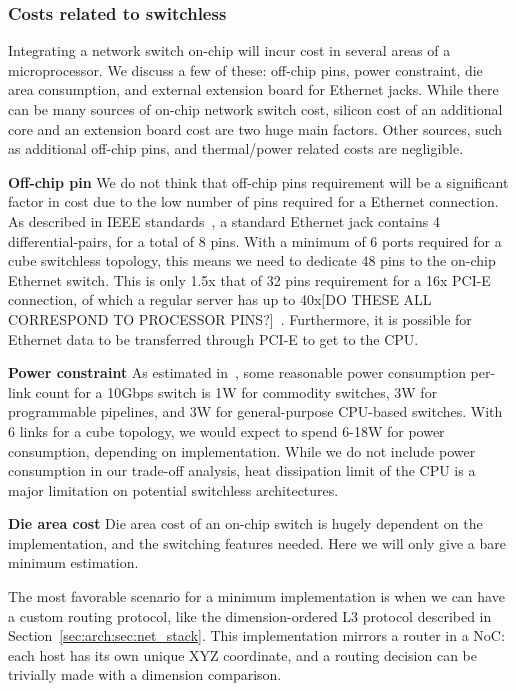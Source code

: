 \subsubsection{Costs related to switchless}
Integrating a network switch on-chip will incur cost in several areas of a microprocessor. We discuss a few of these: off-chip pins, power constraint, die area consumption, and external extension board for Ethernet jacks. While there can be many sources of on-chip network switch cost, silicon cost of an additional core and an extension board cost are two huge main factors. Other sources, such as additional off-chip pins, and thermal/power related costs are negligible. 
\newcommand{\subsubsubsection}{\textbf}

\subsubsubsection{Off-chip pin}
We do not think that off-chip pins requirement will be a significant factor in cost due to the low number of pins required for a Ethernet connection. As described in IEEE standards~\cite{eithercitation?}, a standard Ethernet jack contains 4 differential-pairs, for a total of 8 pins. With a minimum of 6 ports required for a cube switchless topology, this means we need to dedicate 48 pins to the on-chip Ethernet switch. This is only 1.5x that of 32 pins requirement for a 16x PCI-E connection, of which a regular server has up to 40x[DO THESE ALL CORRESPOND TO PROCESSOR PINS?]~\cite{https://www-ssl.intel.com/content/www/us/en/processors/xeon/xeon-e5-v2-datasheet-vol-1.htmlFIXME}. Furthermore, it is possible for Ethernet data to be transferred through PCI-E to get to the CPU.

\subsubsubsection{Power constraint}
As estimated in~\cite{cheap_silicon}, some reasonable power consumption per-link count for a 10Gbps switch is 1W for commodity switches, 3W for programmable pipelines, and 3W for general-purpose CPU-based switches. With 6 links for a cube topology, we would expect to spend 6-18W for power consumption, depending on implementation. While we do not include power consumption in our trade-off analysis, heat dissipation limit of the CPU is a major limitation on potential switchless architectures.

\subsubsubsection{Die area cost}
Die area cost of an on-chip switch is hugely dependent on the implementation, and the switching features needed. Here we will only give a bare minimum estimation.

The most favorable scenario for a minimum implementation is when we can have a custom routing protocol, like the dimension-ordered L3 protocol described in Section~\ref{sec:arch:sec:net_stack}. This implementation mirrors a router in a NoC: each host has its own unique XYZ coordinate, and a routing decision can be trivially made with a dimension comparison.

